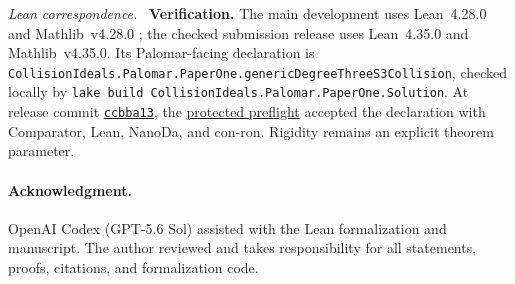 \documentclass[11pt]{article}
\theoremstyle{remark}
\newcommand{\leanpath}[1]{\texttt{\nolinkurl{#1}}}
\newenvironment{leanfiles}
  {\par\medskip\begingroup\footnotesize\raggedright\noindent
   \textit{Lean correspondence.}\ }
  {\par\endgroup\medskip}
\begin{document}
\begin{leanfiles}
\medskip\noindent\textbf{Verification.}
The main development uses Lean~4.28.0 and Mathlib~v4.28.0
\cite{Lean4,Mathlib}; the checked submission release uses Lean~4.35.0 and
Mathlib~v4.35.0.  Its Palomar-facing declaration is
\leanpath{CollisionIdeals.Palomar.PaperOne.genericDegreeThreeS3Collision},
checked locally by
\texttt{lake build CollisionIdeals.Palomar.PaperOne.Solution}.
At release commit
\href{https://github.com/what-social-construct/jacobian-collision-geometry/tree/ccbba1356d6e737e1e7dd336a7014360e2f52251}
{\texttt{ccbba13}}, the
\href{https://github.com/what-social-construct/jacobian-collision-geometry/actions/runs/41967486280}
{protected preflight} accepted the declaration with Comparator, Lean,
NanoDa, and con-ron.  Rigidity remains an explicit theorem parameter.
\end{leanfiles}

\paragraph{Acknowledgment.}
OpenAI Codex (GPT-5.6 Sol) assisted with the Lean formalization and
manuscript.  The author reviewed and takes responsibility for all statements, proofs,
citations, and formalization code.

\begingroup
\small


\endgroup
\end{document}
